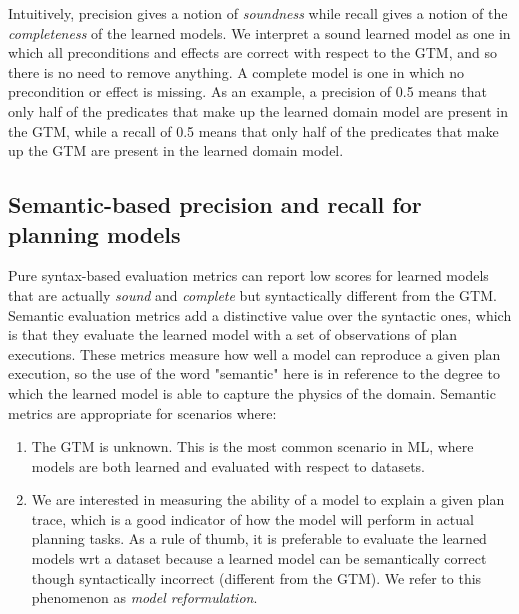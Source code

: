 Intuitively, precision gives a notion of {\em soundness} while recall gives a notion of the {\em completeness} of the learned models. We interpret a sound learned model as one in which all preconditions and effects are correct with respect to the GTM, and so there is no need to remove anything. A complete model is one in which no precondition or effect is missing.
As an example, a precision of 0.5 means that only half of the predicates that make up the learned domain model are present in the GTM, while a recall of 0.5 means that only half of the predicates that make up the GTM are present in the learned domain model.

\subsection{Semantic-based precision and recall for planning models}
\label{semantic_precision_recall}

Pure syntax-based evaluation metrics can report low scores for learned models that are actually {\em sound} and {\em complete} but syntactically different from the GTM. Semantic evaluation metrics add a distinctive value over the syntactic ones, which is that they evaluate the learned model with a set of observations of plan executions. These metrics measure how well a model can reproduce a given plan execution, so the use of the word "semantic" here is in reference to the degree to which the learned model is able to capture the physics of the domain. Semantic metrics are appropriate for scenarios where:

\begin{enumerate}
	\item The GTM is unknown. This is the most common scenario in ML, where models are both learned and evaluated with respect to datasets.
	\item We are interested in measuring the ability of a model to explain a given plan trace, which is a good indicator of how the model will perform in actual planning tasks. As a rule of thumb, it is preferable to evaluate the learned models wrt a dataset because a learned model can be semantically correct though syntactically incorrect (different from the GTM). We refer to this phenomenon as \emph{model reformulation}.
\end{enumerate}


